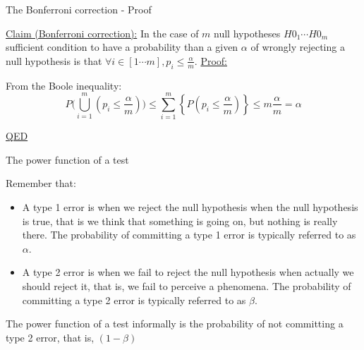 \documentclass{beamer}
\begin{document}

\begin{frame}
{\centerline{The Bonferroni correction - Proof}}
\underline{Claim (Bonferroni correction):} In the case of $m$ null hypotheses $H0_1 \cdots H0_m$ sufficient condition to have a probability than a given $\alpha$ of wrongly rejecting a null hypothesis is that $\forall i \in [1 \cdots m], p_i \leq \frac{\alpha}{m}$.
\newline 
\underline{Proof:}

From the Boole inequality:
$$P \big(\bigcup_{i=1}^{m}(p_i\leq\frac \alpha m ) \big) \leq\sum_{i=1}^{m}\left\{P\left(p_i\leq\frac \alpha m\right)\right\} \leq m \frac \alpha m = \alpha$$

\underline{QED}
\end{frame}



\begin{frame}
{\centerline{The power function of a test}}
Remember that:
\begin{itemize}
\item A type 1 error is when we reject the null hypothesis when the null hypothesis is true, that is we think that something is going on, but nothing is really there. The probability of committing a type 1 error is typically referred to as $\alpha$.
\item A type 2 error is when we fail to reject the null hypothesis when actually we should reject it, that is, we fail to perceive a phenomena. The probability of committing a type 2 error is typically referred to as $\beta$.
\end{itemize}

The power function of a test informally is the probability of not committing a type 2 error, that is, $(1-\beta)$

\end{frame}
\end{document}
